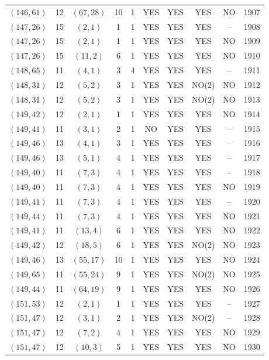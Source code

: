 \begin{longtable}{|c|c|c|c|c|c|c|c|c|c|}
$(146, 61)$ & 12 & $(67, 28)$ & 10 & 1 & YES & YES & YES & NO & 1907\\
$(147, 26)$ & 15 & $(2, 1)$ & 1 & 1 & YES & YES & YES & -- & 1908\\
$(147, 26)$ & 15 & $(2, 1)$ & 1 & 1 & YES & YES & YES & NO & 1909\\
$(147, 26)$ & 15 & $(11, 2)$ & 6 & 1 & YES & YES & YES & NO & 1910\\
$(148, 65)$ & 11 & $(4, 1)$ & 3 & 4 & YES & YES & YES & -- & 1911\\
$(148, 31)$ & 12 & $(5, 2)$ & 3 & 1 & YES & YES & NO(2) & NO & 1912\\
$(148, 31)$ & 12 & $(5, 2)$ & 3 & 1 & YES & YES & NO(2) & NO & 1913\\
$(149, 42)$ & 12 & $(2, 1)$ & 1 & 1 & YES & YES & YES & NO & 1914\\
$(149, 41)$ & 11 & $(3, 1)$ & 2 & 1 & NO & YES & YES & -- & 1915\\
$(149, 46)$ & 13 & $(4, 1)$ & 3 & 1 & YES & YES & YES & -- & 1916\\
$(149, 46)$ & 13 & $(5, 1)$ & 4 & 1 & YES & YES & YES & -- & 1917\\
$(149, 40)$ & 11 & $(7, 3)$ & 4 & 1 & YES & YES & YES & -- & 1918\\
$(149, 40)$ & 11 & $(7, 3)$ & 4 & 1 & YES & YES & YES & NO & 1919\\
$(149, 41)$ & 11 & $(7, 3)$ & 4 & 1 & YES & YES & YES & -- & 1920\\
$(149, 44)$ & 11 & $(7, 3)$ & 4 & 1 & YES & YES & YES & NO & 1921\\
$(149, 41)$ & 11 & $(13, 4)$ & 6 & 1 & YES & YES & YES & NO & 1922\\
$(149, 42)$ & 12 & $(18, 5)$ & 6 & 1 & YES & YES & NO(2) & NO & 1923\\
$(149, 46)$ & 13 & $(55, 17)$ & 10 & 1 & YES & YES & YES & NO & 1924\\
$(149, 65)$ & 11 & $(55, 24)$ & 9 & 1 & YES & YES & NO(2) & NO & 1925\\
$(149, 44)$ & 11 & $(64, 19)$ & 9 & 1 & YES & YES & YES & NO & 1926\\
$(151, 53)$ & 12 & $(2, 1)$ & 1 & 1 & YES & YES & YES & -- & 1927\\
$(151, 47)$ & 12 & $(3, 1)$ & 2 & 1 & YES & YES & NO(2) & -- & 1928\\
$(151, 47)$ & 12 & $(7, 2)$ & 4 & 1 & YES & YES & YES & NO & 1929\\
$(151, 47)$ & 12 & $(10, 3)$ & 5 & 1 & YES & YES & YES & NO & 1930\\

\end{longtable}
